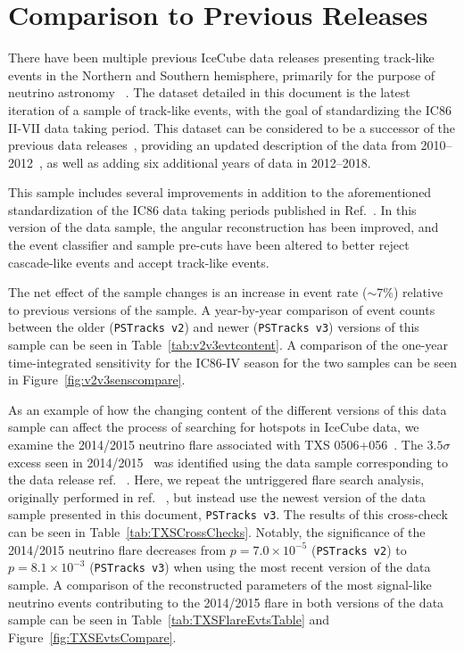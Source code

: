\documentclass[aps,10pt,prd,twocolumn,floats,letterpaper,showpacs,nofootinbib,bibnotes,notitlepage,superscriptaddress,floatfix]{revtex4-1}
\newcommand{\MA}[1]{{\color{black}#1}}
\begin{document}
\section{Comparison to Previous Releases}\label{secIV}

There have been multiple previous IceCube data releases presenting track-like events in the Northern and Southern hemisphere, primarily for the purpose of neutrino astronomy ~\cite{Abbasi:2010rd,Aartsen:2013uuv,IceCube:2018,IceCube:2019,IceCube:TXS2018}. The dataset detailed in this document is the latest iteration of a sample of track-like events, with the goal of standardizing the IC86 II-VII data taking period. This dataset can be considered to be a successor of the previous data releases~\cite{IC40data,IC59data,IceCube:2018}, providing an updated description of the data from 2010--2012~\cite{IceCube:2018}, as well as adding six additional years of data in 2012--2018. 

This sample includes several improvements in addition to the aforementioned standardization of the IC86 data taking periods published in Ref.~\cite{IceCube:2018}. In this version of the data sample, the angular reconstruction has been improved, and the event classifier and sample pre-cuts have been altered to better reject cascade-like events and accept track-like events. 

The net effect of the sample changes is an increase in event rate ($\sim$7\%) relative to previous versions of the sample. A year-by-year comparison of event counts between the older \MA{({\tt PSTracks v2})} and newer \MA{({\tt PSTracks v3})} versions of this sample can be seen in Table~\ref{tab:v2v3evtcontent}. A comparison of the one-year time-integrated sensitivity for the IC86-IV season for the two samples can be seen in Figure~\ref{fig:v2v3senscompare}.

As an example of how the changing content of the different versions of this data sample can affect the process of searching for hotspots in IceCube data, we examine the 2014/2015 neutrino flare associated with TXS 0506+056~\cite{IceCube:2018cha}. The $3.5 \sigma$ excess seen in 2014/2015~\cite{IceCube:2018cha} was identified using the data sample corresponding to the data release ref. ~\cite{IceCube:2019}. Here, we repeat the untriggered flare search analysis, originally performed in ref. ~\cite{IceCube:2018cha}, but instead use the newest version of the data sample presented in this document, {\tt PSTracks v3}. The results of this cross-check can be seen in Table~\ref{tab:TXSCrossChecks}. Notably, the significance of the 2014/2015 neutrino flare decreases from $p=7.0 \times 10^{-5}$ ({\tt PSTracks v2}) to $p=8.1 \times 10^{-3}$ ({\tt PSTracks v3}) when using the most recent version of the data sample. A comparison of the reconstructed parameters of the most signal-like neutrino events contributing to the 2014/2015 flare in both versions of the data sample can be seen in Table~\ref{tab:TXSFlareEvtsTable} and Figure~\ref{fig:TXSEvtsCompare}.
\end{document}
